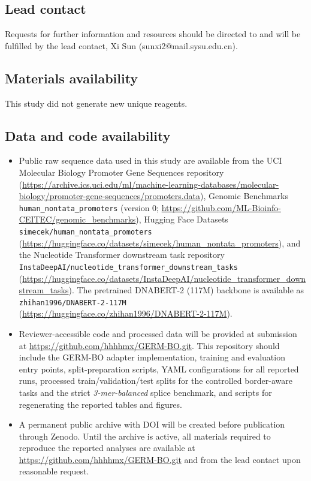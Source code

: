 \documentclass[12pt,letterpaper]{article}
\newcommand{\splitname}[1]{\textit{#1}}
\begin{document}
\subsection*{Lead contact}
Requests for further information and resources should be directed to and will be fulfilled by the lead contact, Xi Sun (sunxi2@mail.sysu.edu.cn).

\subsection*{Materials availability}
This study did not generate new unique reagents.

\subsection*{Data and code availability}
\begingroup
\sloppy
\begin{itemize}
  \item Public raw sequence data used in this study are available from the UCI Molecular Biology Promoter Gene Sequences repository (\url{https://archive.ics.uci.edu/ml/machine-learning-databases/molecular-biology/promoter-gene-sequences/promoters.data}), Genomic Benchmarks \texttt{human\_nontata\_promoters} (version 0; \url{https://github.com/ML-Bioinfo-CEITEC/genomic_benchmarks}), Hugging Face Datasets \texttt{simecek/human\_nontata\_promoters} (\url{https://huggingface.co/datasets/simecek/human_nontata_promoters}), and the Nucleotide Transformer downstream task repository \texttt{InstaDeepAI/nucleotide\_transformer\_downstream\_tasks}~\cite{nucleotidetransformer2024} (\url{https://huggingface.co/datasets/InstaDeepAI/nucleotide_transformer_downstream_tasks}). The pretrained DNABERT-2 (117M) backbone is available as \texttt{zhihan1996/DNABERT-2-117M}~\cite{dnabert22023} (\url{https://huggingface.co/zhihan1996/DNABERT-2-117M}).
  \item Reviewer-accessible code and processed data will be provided at submission at \url{https://github.com/hhhhmx/GERM-BO.git}. This repository should include the GERM-BO adapter implementation, training and evaluation entry points, split-preparation scripts, YAML configurations for all reported runs, processed train/validation/test splits for the controlled border-aware tasks and the strict \splitname{3-mer-balanced} splice benchmark, and scripts for regenerating the reported tables and figures.
  \item A permanent public archive with DOI will be created before publication through Zenodo. Until the archive is active, all materials required to reproduce the reported analyses are available at \url{https://github.com/hhhhmx/GERM-BO.git} and from the lead contact upon reasonable request.
\end{itemize}
\endgroup
\end{document}
